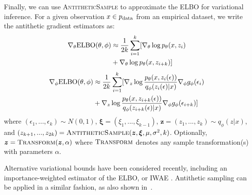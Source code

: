 Finally, we can use \textsc{AntitheticSample} to approximate the ELBO for variational inference.
For a given observation $x \in p_\textup{data}$ from an empirical dataset, we write the antithetic gradient estimators as:
\begin{equation}
    \begin{split}
        \nabla_\theta \textup{ELBO}(\theta, \phi) &\approx \frac{1}{2k}\sum_{i=1}^{k}[\nabla_\theta \log p_\theta(x, z_i) \\
        & + \nabla_\theta \log p_\theta(x, z_{i+k}) ]\label{eqn:grad_anti1}
    \end{split}
\end{equation}
\begin{equation}
    \begin{split}
        \nabla_\phi \textup{ELBO}(\theta, \phi) &\approx \frac{1}{2k}\sum_{i=1}^{k}[\nabla_{z} \log \frac{p_\theta(x, z_i(\epsilon))}{q_\phi(z_i(\epsilon)|x)}\nabla_\phi g_\phi(\epsilon_i) \\
        & + \nabla_{z} \log \frac{p_\theta(x, z_{i+k}(\epsilon))}{q_\phi(z_{i+k}(\epsilon)|x)}\nabla_\phi g_\phi(\epsilon_{i+k})]\label{eqn:grad_anti2}
    \end{split}
\end{equation}
where $(\epsilon_1, ..., \epsilon_k) \sim N(0, 1)$, $\boldsymbol{\xi} = (\xi_1, ..., \xi_{k-1})$, $\boldsymbol{z} = (z_1, ..., z_k) \sim q_\phi(z|x)$, and $(z_{k+1}, ..., z_{2k}) = \textsc{AntitheticSample}(\boldsymbol{z}, \boldsymbol{\xi}, \mu, \sigma^2, k)$. Optionally, $\boldsymbol{z} = \textsc{Transform}(\boldsymbol{z}, \alpha)$ where $\textsc{Transform}$ denotes any sample transformation(s) with parameters $\alpha$.

Alternative variational bounds have been considered recently, including an importance-weighted estimator of the ELBO, or IWAE \cite{burda2015importance}. Antithetic sampling can be applied in a similar fashion, as also shown in~\cite{shu2019buffered}.

